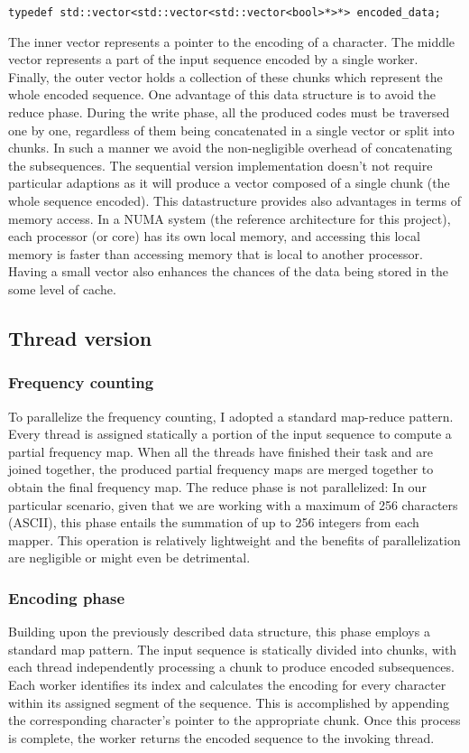 \documentclass{article}
\begin{document}
\begin{verbatim}
typedef std::vector<std::vector<std::vector<bool>*>*> encoded_data;
\end{verbatim}

The inner vector represents a
pointer to the encoding of a character. The middle vector
represents a part of the input sequence encoded by a single worker.
Finally, the outer vector holds a collection of these chunks which represent
the whole encoded sequence.
One advantage of this data structure is to avoid the reduce phase.
During the write phase, all the produced codes must be traversed one by one, regardless
of them being concatenated in a single vector or split into chunks. In such a manner we
avoid the non-negligible overhead of concatenating the subsequences.
The sequential version implementation doesn't not require particular adaptions as it
will produce a vector composed of a single chunk (the whole sequence encoded).
This datastructure provides also advantages in terms of memory access.
In a NUMA system (the reference architecture for this project), each processor (or core) has its own local memory,
and accessing this local memory is faster than accessing memory that is local to another processor.
Having a small vector also enhances the chances of the data being stored in the some level of cache.

\subsection{Thread version}
\subsubsection{Frequency counting}
To parallelize the frequency counting, I adopted a standard
map-reduce pattern. Every thread is assigned statically a portion of
the input sequence to compute a partial frequency map.
When all the threads have finished their task and are joined together,
the produced partial frequency maps are merged together to obtain the final
frequency map. The reduce phase is not parallelized:
In our particular scenario, given that we are working with a maximum of 256 characters (ASCII),
this phase entails the summation of up to 256 integers from each mapper.
This operation is relatively lightweight and the benefits of parallelization are negligible
or might even be detrimental.
\subsubsection{Encoding phase}
Building upon the previously described data structure, this phase employs a standard map pattern.
The input sequence is statically divided into chunks, with each thread independently processing a
chunk to produce encoded subsequences.
Each worker identifies its index and calculates the encoding for every character within
its assigned segment of the sequence. This is accomplished by appending the corresponding
character's pointer to the appropriate chunk. Once this process is complete, the worker returns
the encoded sequence to the invoking thread.
\end{document}
